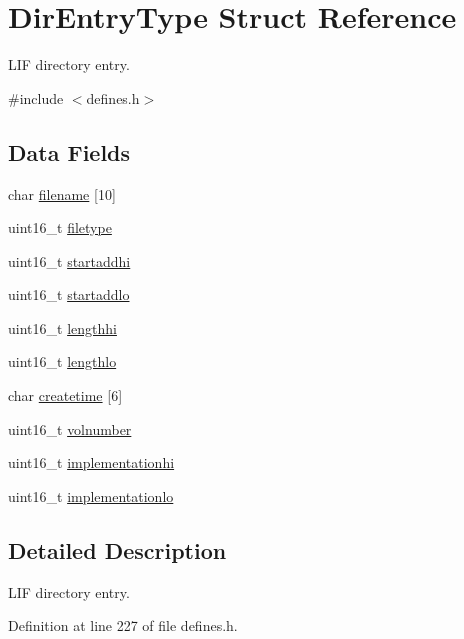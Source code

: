 \hypertarget{structDirEntryType}{}\section{Dir\+Entry\+Type Struct Reference}
\label{structDirEntryType}


L\+IF directory entry.  




{\ttfamily \#include $<$defines.\+h$>$}

\subsection*{Data Fields}
\begin{DoxyCompactItemize}
\item 
char \hyperlink{structDirEntryType_aa60fae0a6b7ba9c966cbcf46e555f396}{filename} \mbox{[}10\mbox{]}
\item 
uint16\+\_\+t \hyperlink{structDirEntryType_ada14562440087858ebf04bc4c81eedd2}{filetype}
\item 
uint16\+\_\+t \hyperlink{structDirEntryType_a0cab2915e9f864e25b24d298c36c11db}{startaddhi}
\item 
uint16\+\_\+t \hyperlink{structDirEntryType_aea0e798bb172b4bddf174ce339a4a54a}{startaddlo}
\item 
uint16\+\_\+t \hyperlink{structDirEntryType_ad7aaba7b01038bc8bacb096bd66fff08}{lengthhi}
\item 
uint16\+\_\+t \hyperlink{structDirEntryType_ad1cde25a0229866557cd5983c27fbd31}{lengthlo}
\item 
char \hyperlink{structDirEntryType_a627fd55537c73d4fee596b140e106c01}{createtime} \mbox{[}6\mbox{]}
\item 
uint16\+\_\+t \hyperlink{structDirEntryType_add9ab11f89586efb100471f6580e75c5}{volnumber}
\item 
uint16\+\_\+t \hyperlink{structDirEntryType_a27a15eea3264d44c9e93e3be77093151}{implementationhi}
\item 
uint16\+\_\+t \hyperlink{structDirEntryType_a8164d577c06fb7c312aaa4955d491449}{implementationlo}
\end{DoxyCompactItemize}


\subsection{Detailed Description}
L\+IF directory entry. 

Definition at line 227 of file defines.\+h.



